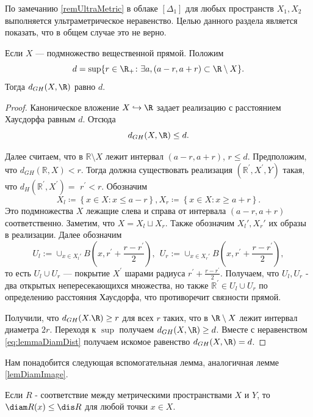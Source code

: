 По замечанию \ref{remUltraMetric} в облаке \( [\Delta _1] \) для
любых пространств \( X_1, X_2 \) выполняется ультраметрическое
неравенство. Целью данного раздела является показать, что в общем
случае это не верно.
\begin{lemma}
  Если $X$ --- подмножество вещественной прямой. Положим
  \[
    d =\sup\{r\in \R_+ \colon \exists a, (a-r, a+r)\subset \R
    \setminus X \}.
  \]
  Тогда \( d_{GH}(X,\R) \) равно \( d \).
  \label{lemmaDiamDist}
\end{lemma}
\begin{proof} Каноническое вложение \( X \hookrightarrow \R \) задает
  реализацию с расстоянием Хаусдорфа равным \( d \).
  Отсюда
  \begin{equation}
    d_{GH}(X, \R) \le d.
    \label{eq:lemmaDiamDist}
  \end{equation}

  Далее считаем, что в $\mathbb{R} \setminus X$ лежит
  интервал $(a-r, a+r)$, \( r \le d \).
  Предположим, что $d_{G H}(\mathbb{R}, X)<r$. Тогда должна
  существовать реализация
  $\left(\mathbb{R}^{\prime}, X^{\prime}, Y\right)$ такая, что
  $d_H\left(\mathbb{R}^{\prime},
  X^{\prime}\right)=$ $r^{\prime}<r$. Обозначим
  \[
    X_l \coloneqq \left\{x\in X \colon x \le a-r\right\},
    X_r \coloneqq \left\{x\in X \colon x \ge a+r\right\}.
  \]
  Это подмножества \( X \) лежащие слева и справа от интервала \(
  (a-r, a+r) \) соответственно. Заметим, что \( X = X_l \sqcup X_r
  \). Также обозначим \( X_l', X_r'\) их образы в реализации.
  Далее обозначим \[U_l:=\cup_{x \in
    X_l'} B\left(x,
    r^{\prime}+\frac{r-r^{\prime}}{2}\right),~~ U_r:=\cup_{x \in
    X_r'} B\left(x,
  r^{\prime}+\frac{r-r^{\prime}}{2}\right),\]
  то есть $U_l \cup U_r$ --- покрытие $X^{\prime}$ шарами радиуса
  $r^\prime + \frac{r-r^{\prime}}{2}$.
  Получаем, что $U_l, U_r$ - два открытых непересекающихся множества,
  но также $\mathbb{R}^{\prime} \in U_l \cup U_r$ по определению
  расстояния Хаусдорфа, что противоречит
  связности прямой.

  Получили, что \( d_{GH}(X. \R) \ge r \) для всех \( r \) таких, что
  в \( \R \setminus X \) лежит интервал диаметра \( 2r \). Переходя к
  \( \sup \) получаем \( d_{GH}(X, \R) \ge d \). Вместе с
  неравенством \ref{eq:lemmaDiamDist} получаем искомое равенство \(
  d_{GH}(X, \R) = d\).
\end{proof}
Нам понадобится следующая вспомогательная лемма, аналогичная лемме
\ref{lemDiamImage}.
\begin{lemma}
  Если \( R \) - соответствие между метрическими пространствами \( X
  \) и \( Y \), то \( \diam R(x) \le \dis R \) для любой точки \( x\in X \).
\end{lemma}
